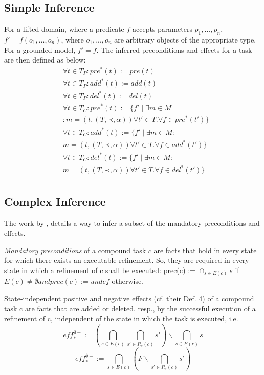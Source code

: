 \documentclass[letterpaper]{article} %
\newcommand{\Pre} {\ensuremath{\mathit{pre}}}  %
\newcommand{\Add} {\ensuremath{\mathit{add}}}
\newcommand{\Del} {\ensuremath{\mathit{del}}}
\newcommand{\PreS} {\ensuremath{\mathit{pre^{*}}}}
\newcommand{\AddS} {\ensuremath{\mathit{add^{*}}}}
\newcommand{\DelS} {\ensuremath{\mathit{del^{*}}}}
\newcommand{\singlePrec} {\ensuremath{\mathit{ \mathord{\prec} }}}
\newcommand{\RelEffPlus} {\ensuremath{\mathit{eff^{\emptyset +}_{*}}}}
\newcommand{\RelEffMinus} {\ensuremath{\mathit{eff^{\emptyset -}_{*}}}}
\begin{document}
\subsection{Simple Inference}
For a lifted domain, where a predicate $f$ accepts parameters $p_1, ..., p_n$, 
$f' = f(o_1, ..., o_n)$, where $o_1, ..., o_n$ are arbitrary objects of the appropriate type. For a grounded model, $f' = f$. The inferred preconditions and effects for a task are then defined as below:
\begin{align*}
& \forall t \in T_P : \PreS(t) := \Pre(t) \\
& \forall t \in T_P : \AddS(t) := \Add(t) \\
& \forall t \in T_P : \DelS(t) := \Del(t)  \\ %
& \forall t \in T_C : \PreS(t) := \{f'  \mid  \exists m \in M  \\
& : m=(t,(T, \singlePrec, \alpha)) \forall t' \in T.  \forall  f \in \PreS(t') \}   \\
& \forall t \in T_C : \AddS(t) := \{f'  \mid  \exists m \in M : \\
& m=(t,(T, \singlePrec, \alpha)) \forall t' \in T.  \forall  f \in \AddS(t') \}   \\
& \forall t \in T_C : \DelS(t) := \{f'  \mid  \exists m \in M : \\
& m=(t,(T, \singlePrec, \alpha)) \forall t' \in T.  \forall  f \in \DelS(t') \}   \\ 
\end{align*}


\subsection{Complex Inference}
The work by \cite{ConnyPreEff}, details a way to infer a subset of the mandatory preconditions and effects.

\emph{Mandatory preconditions} of a compound task $c$ are facts that hold in every state for which there exists an executable refinement. So, they are required in every state in which a refinement of c shall be executed: prec(c) := $\cap_{s \in E(c)}  s$
if $E(c) \neq \emptyset and prec(c) := undef$ otherwise.

State-independent positive and negative effects (cf. their
Def. 4) of a compound task c are facts that are added or
deleted, resp., by the successful execution of a refinement of
c, independent of the state in which the task is executed, i.e.
$$ \RelEffPlus := ( \bigcap_{s \in E(c)} \bigcap_{s' \in R_s(c)} s') \backslash  \bigcap_{s \in E(c)} s    $$
$$ \RelEffMinus := \bigcap_{s \in E(c)}  (F \backslash \bigcap_{s' \in R_s(c)} s' ) $$
\end{document}
